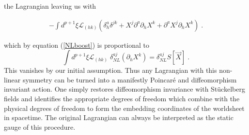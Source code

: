 \documentclass[%
 reprint,
 amsmath,amssymb,
 aps,
]{revtex4-1}
\begin{document}
the Lagrangian leaving us with
\begin{widetext}
    \begin{eqnarray}
        -\int d^{p+1} \xi \mathcal{L}_{(h k)}
        \left( \delta^a_h \delta^{j k} + X^j \partial^a \partial_h X^k
        + \partial^a X^j \partial_h X^k \right) \; . \nonumber
    \end{eqnarray}
\end{widetext}
which by equation (\ref{NLboost}) is proportional to
\begin{equation}
    \int d^{p+1} \xi \mathcal{L}_{(h k)} \; \delta^{a j}_{NL} (\partial_h X^k)
    = \delta^{a j}_{NL} S[\vec{X}] \; .
\end{equation}
This vanishes by our initial assumption. Thus any Lagrangian with this non-linear symmetry can be turned into a
manifestly Poincar\'{e} and diffeomorphism invariant action. One simply restores diffeomorphism invariance
with St\"uckelberg fields and identifies the appropriate degrees of freedom which combine with the physical
degrees of freedom to form the embedding coordinates of the worldsheet in spacetime. The original
Lagrangian can always be interpreted as the static gauge of this procedure.
\end{document}
